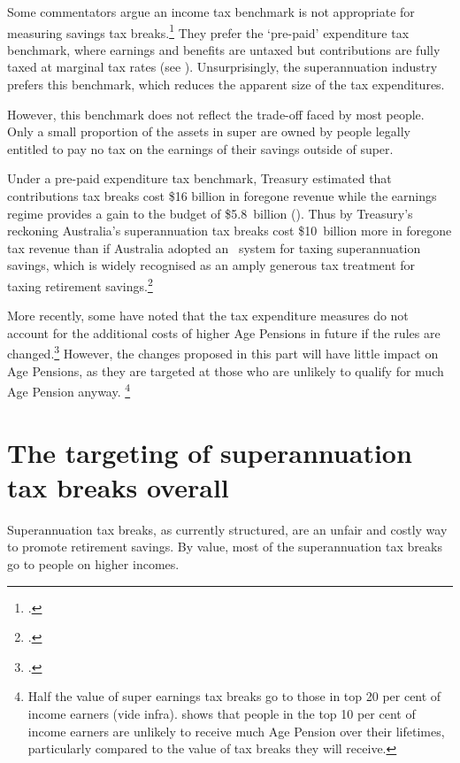 Some commentators argue  an income tax benchmark is not appropriate for measuring savings tax breaks.\footcites{Carling2015}{Sloan2015} They prefer the ‘pre-paid’ expenditure tax benchmark, where earnings and benefits are untaxed but contributions are fully taxed at marginal tax rates (see ). Unsurprisingly, the superannuation industry prefers this benchmark, which reduces the apparent size of the tax expenditures. 

However, this benchmark does not reflect the trade-off faced by most people. Only a small proportion of the assets in super are owned by people legally entitled to pay no tax on the earnings of their savings outside of super. 

Under a pre-paid expenditure tax benchmark, Treasury estimated that contributions tax breaks cost \$16 billion in foregone revenue while the earnings regime provides a gain to the budget of \$5.8~billion (\textcite{Treasury2014TES2013}). Thus by Treasury's reckoning Australia’s superannuation tax breaks cost \$10~billion more in foregone tax revenue than if Australia adopted an \EET\ system for taxing superannuation savings, which is widely recognised as an amply generous tax treatment for taxing retirement savings.\footcites{MaddockKing2015}{Freebairn2015}

More recently, some have noted that the tax expenditure measures do not account for the additional costs of higher Age Pensions in future if the rules are changed.\footcites[][5--6]{Mercer2013a}[][13--14]{FSC2015}[][3]{Clare2015}
However, the changes proposed in this part will have little impact on Age Pensions, as they are targeted at those who are unlikely to qualify for much Age Pension anyway.%
\footnote{Half the value of super earnings tax breaks go to those in top 20 per cent of income earners (vide  {infra}).   shows that people in the top 10 per cent of income earners are unlikely to receive much Age Pension over their lifetimes, particularly compared to the value of tax breaks they will receive.}  



\chapter{The targeting of superannuation tax breaks overall}
Superannuation tax breaks, as currently structured, are an unfair and costly way to promote retirement savings. By value, most of the superannuation tax breaks go to people on higher incomes. 

